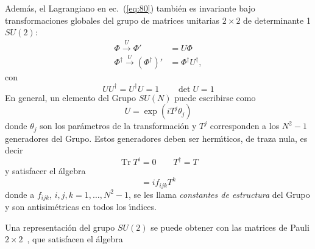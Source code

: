 Adem\'as, el Lagrangiano en ec.~(\ref{eq:80}) tambi\'en es invariante bajo transformaciones  globales del grupo de matrices unitarias $2\times2$ de determinante 1 $SU(2)$:
\begin{align}
  \Phi\overset{U}{\to}\Phi'&=U\Phi\\
  \Phi^\dagger\overset{U}{\to}\left({\Phi^\dagger}\right)'&=\Phi^\dagger U^\dagger,\nonumber
\end{align}
con
\begin{equation}
  UU^\dagger=U^\dagger U=1\qquad \det U=1
\end{equation}
En general, un elemento del Grupo $SU(N)$ puede escribirse como
\begin{equation}
  U=\exp(iT^j\theta_j)
\end{equation}
donde $\theta_j$ son los par\'ametros de la transformaci\'on y $T^j$ corresponden a los $N^2-1$ generadores del Grupo. Estos generadores deben ser herm\'\i ticos, de traza nula, es decir
\begin{equation}
  \operatorname{Tr} T^i=0\qquad T^\dagger=T
\end{equation}
y satisfacer el \'algebra
\begin{equation}
  [T^i,T^j]=if_{ijk}T^k
\end{equation}
donde a $f_{ijk}$, $i,j,k=1,\ldots,N^2-1$, se les llama \emph{constantes de estructura} del Grupo y son antisim\'etricas en todos los \'\i ndices.

Una representaci\'on del grupo $SU(2)$ se puede obtener con las matrices de Pauli $2\times2$~\cite{Pauli}, que satisfacen el \'algebra

